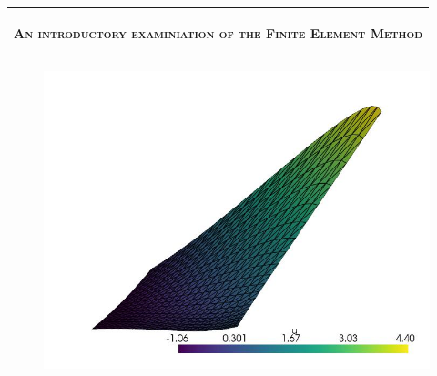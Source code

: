 %
%
%
%
%
\begin{titlepage}
  \addtolength{\hoffset}{0.5\evensidemargin-0.5\oddsidemargin} %
  \noindent%
  \begin{tabular}{@{}p{\textwidth}@{}}
    \toprule[2pt]
    \midrule
    \vspace{0.4cm}
    \begin{center}
    \Huge{\textsc{An introductory examiniation of the Finite Element Method}}
    \end{center}
    \vspace{0.4cm}\\
    \midrule
    \toprule[2pt]
  \end{tabular}
  \vspace{0.8cm}
  \setlength\fboxsep{0pt}
    \begin{figure}[ht]
        \centering
      \includegraphics[width=\textwidth]{Afsnit/Application/figurer/screenshot_3.jpeg}

\end{figure}
\end{titlepage}
